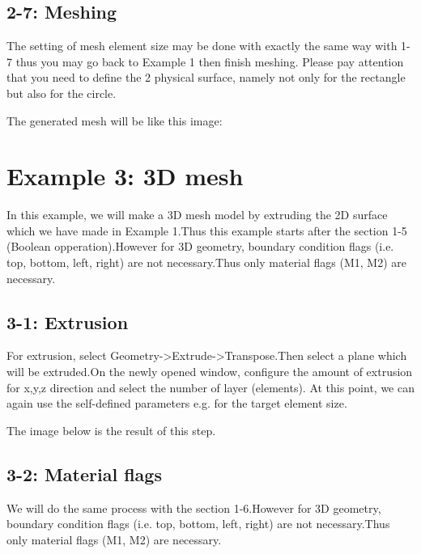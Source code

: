 \documentclass[letterpaper,10pt,english]{sphinxmanual}
\begin{document}
\subsection{2-7: Meshing}
\label{\detokenize{meshing:id3}}
The setting of mesh element size may be done with exactly the same way with 1-7 thus you may go back to Example 1 then finish meshing.
Please pay attention that you need to define the 2 physical surface, namely not only  for the rectangle but also  for the circle.

The generated mesh will be like this image:




\section{Example 3: 3D mesh}
\label{\detokenize{meshing:example-3-3d-mesh}}
In this example, we will make a 3D mesh model by extruding the 2D surface which we have made in Example 1.Thus this example starts after the section 1-5 (Boolean opperation).However for 3D geometry, boundary condition flags (i.e. top, bottom, left, right) are not necessary.Thus only material flags (M1, M2) are necessary.


\subsection{3-1: Extrusion}
\label{\detokenize{meshing:extrusion}}
For extrusion, select Geometry-\textgreater{}Extrude-\textgreater{}Transpose.Then select a plane which will be extruded.On the newly opened window, configure the amount of extrusion for x,y,z direction and select the number of layer (elements).
At this point, we can again use the self-defined parameters e.g.  for the target element size.



The image below is the result of this step.




\subsection{3-2: Material flags}
\label{\detokenize{meshing:material-flags}}
We will do the same process with the section 1-6.However for 3D geometry, boundary condition flags (i.e. top, bottom, left, right) are not necessary.Thus only material flags (M1, M2) are necessary.
\end{document}
